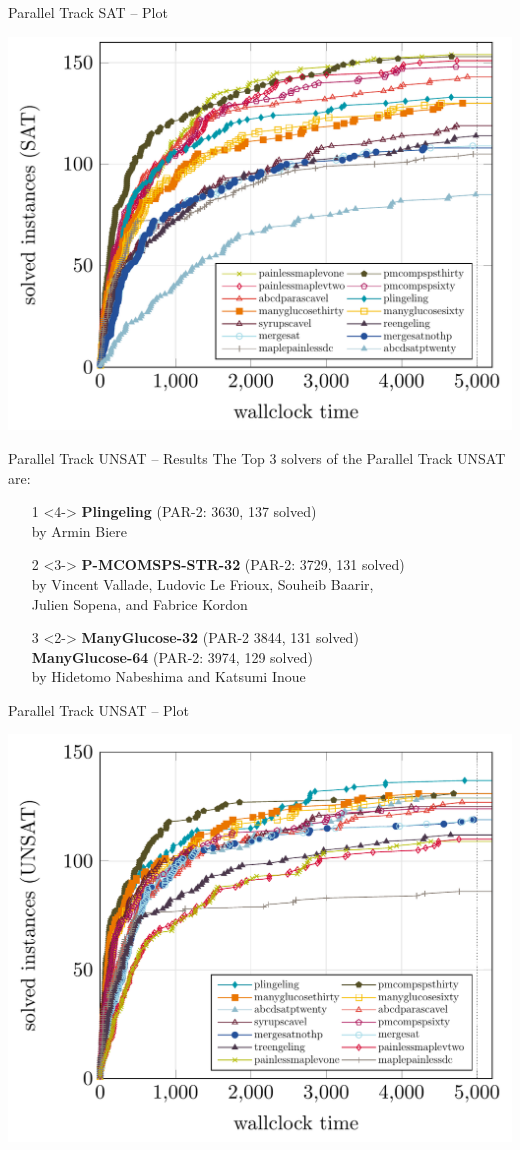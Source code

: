 \documentclass{beamer}
\begin{document}
\begin{frame}{Parallel Track SAT -- Plot}

\centering
\includegraphics[width=.8\textwidth]{parallel-SAT}

\end{frame}


\begin{frame}{Parallel Track UNSAT -- Results}
The Top 3 solvers of the Parallel Track UNSAT are:
\begin{itemize}

\item[1]<4-> {\bf Plingeling} (PAR-2: 3630, 137 solved)\\
by Armin Biere
\item[2]<3-> {\bf P-MCOMSPS-STR-32} (PAR-2: 3729, 131 solved)\\
by Vincent Vallade, Ludovic Le Frioux, Souheib Baarir,\\Julien Sopena, and Fabrice Kordon

\item[3]<2-> {\bf ManyGlucose-32} (PAR-2 3844, 131 solved)\\
{\bf ManyGlucose-64} (PAR-2: 3974, 129 solved)\\
by Hidetomo Nabeshima and Katsumi Inoue
\end{itemize}
\end{frame}


\begin{frame}{Parallel Track UNSAT -- Plot}

\centering
\includegraphics[width=.8\textwidth]{parallel-UNSAT}

\end{frame}
\end{document}
